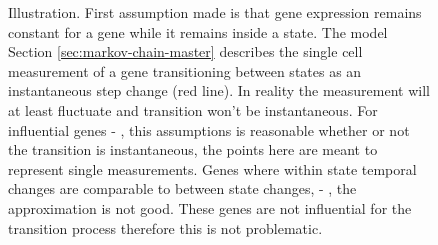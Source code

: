 \begin{figure}
  \centering
  \caption{
    Illustration. First assumption made is that gene expression remains constant for a gene while it remains inside a state. The model Section \ref{sec:markov-chain-master} describes the single cell measurement of a gene transitioning between states as an instantaneous step change (red line). In reality the measurement will at least fluctuate and transition won't be instantaneous. For influential genes  - , this assumptions is reasonable whether or not the transition is instantaneous, the points here are meant to represent single measurements. Genes where within state temporal changes are comparable to between state changes,  - , the approximation is not good. These genes are not influential for the transition process therefore this is not problematic.
}
\end{figure}

